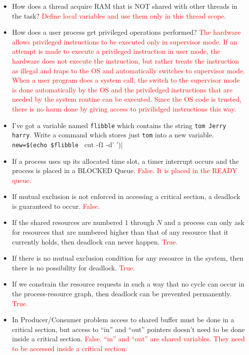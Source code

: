 \documentclass[10pt,landscape]{article}
\newcommand{\answer}[1]{\textcolor{red}{#1}}
\begin{document}
\begin{multicols}{4}
\begin{itemize}
    \item How does a thread acquire RAM that is NOT shared with other threads in the task?  \answer{Define local variables and use them only in this thread scope.}
    \item How does a user process get privileged operations performed? \answer{The hardware allows privileged instructions to be executed only in supervisor mode. If an attempt is made to execute a privileged instruction in user mode, the hardware does not execute the instruction, but rather treats the instruction as illegal and traps to the OS and automatically switches to supervisor mode. When a user program does a system call, the switch to the supervisor mode is done automatically by the OS and the priviledged instructions that are needed by the system routine can be executed. Since the OS code is trusted, there is no harm done by giving access to privilidged instructions this way.}
    \item I've got a variable named \verb$flibble$ which contains the string \verb$tom Jerry harry$. Write a command which stores just \verb$tom$ into a new variable. \verb|new=$(echo $flibble | cut -f1 -d' ')|
    \item If a process uses up its allocated time slot, a timer interrupt occurs and the process is placed in a BLOCKED Queue.  \answer{False. It is placed in the READY queue.}
    \item If mutual exclusion is not enforced in accessing a critical section, a deadlock is guaranteed to occur. \answer{False.}
    \item If the shared resources are numbered $1$ through $N$ and a process can only ask for resources that are numbered higher than that of any resource that it currently holds, then deadlock can never happen. \answer{True.}
    \item If there is no mutual exclusion condition for any resource in the system, then there is no possibility for deadlock. \answer{True.}
    \item If we constrain the resource requests in such a way that no cycle can occur in the process-resource graph, then deadlock can be prevented permanently. \answer{True.}
    \item In Producer/Consumer problem access to shared buffer must be done in a critical section, but access to ``in'' and ``out'' pointers doesn't need to be done inside a critical section.  \answer{False. ``in'' and ``out'' are shared variables. They need to be accessed inside a critical section.}

\end{itemize}
\end{multicols}
\end{document}
